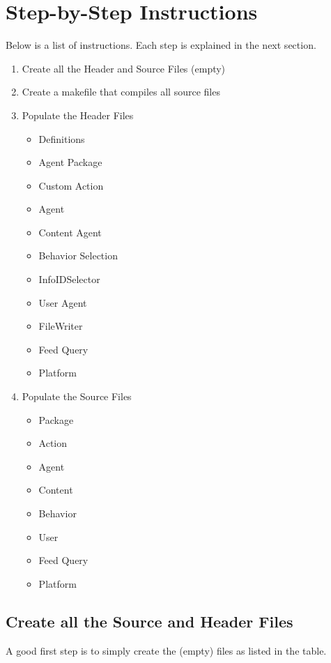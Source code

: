 \section{Step-by-Step Instructions}
Below is a list of instructions. Each step is explained in the next section.
\begin{enumerate}
	\item Create all the Header and Source Files (empty)
	\item Create a makefile that compiles all source files
	\item Populate the Header Files
	\begin{itemize}
  	  \item Definitions
	  \item Agent Package
	  \item Custom Action
	  \item Agent
	  \item Content Agent
	  \item Behavior Selection
	  \item InfoIDSelector
	  \item User Agent
	  \item FileWriter
	  \item Feed Query
	  \item Platform
	\end{itemize}
	\item Populate the Source Files 
	\begin{itemize}
	  \item Package
	  \item Action
	  \item Agent
	  \item Content
	  \item Behavior
	  \item User
	  \item Feed Query
	  \item Platform
      \end{itemize}
\end{enumerate}

\subsection{Create all the Source and Header Files}
A good first step is to simply create the (empty) files as listed in the table.

